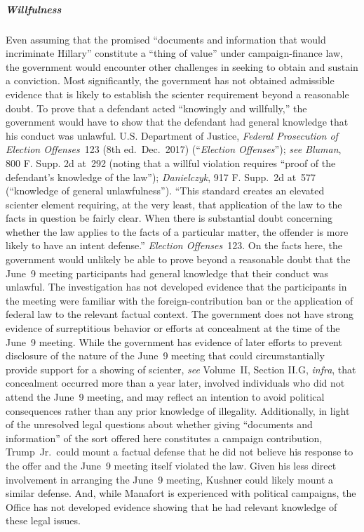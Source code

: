 \subparagraph{Willfulness}
Even assuming that the promised ``documents and information that would incriminate Hillary'' constitute a ``thing of value'' under campaign-finance law, the government would encounter other challenges in seeking to obtain and sustain a conviction.
Most significantly, the government has not obtained admissible evidence that is likely to establish the scienter requirement beyond a reasonable doubt.
To prove that a defendant acted ``knowingly and willfully,'' the government would have to show that the defendant had general knowledge that his conduct was unlawful.
U.S. Department of Justice, \textit{Federal Prosecution of Election Offenses}~123 (8th ed.\ Dec.~2017) (``\textit{Election Offenses}''); \textit{see Bluman}, 800 F. Supp. 2d at~292 (noting that a willful violation requires ``proof of the defendant's knowledge of the law''); \textit{Danielczyk}, 917 F. Supp.~2d at~577 (``knowledge of general unlawfulness'').
``This standard creates an elevated scienter element requiring, at the very least, that application of the law to the facts in question be fairly clear.
When there is substantial doubt concerning whether the law applies to the facts of a particular matter, the offender is more likely to have an intent defense.''
\textit{Election Offenses}~123.
On the facts here, the government would unlikely be able to prove beyond a reasonable doubt that the June~9 meeting participants had general knowledge that their conduct was unlawful.
The investigation has not developed evidence that the participants in the meeting were familiar with the foreign-contribution ban or the application of federal law to the relevant factual context.
The government does not have strong evidence of surreptitious behavior or efforts at concealment at the time of the June~9 meeting.
While the government has evidence of later efforts to prevent disclosure of the nature of the June~9 meeting that could circumstantially provide support for a showing of scienter, \textit{see} Volume~II, Section II.G, \textit{infra}, that concealment occurred more than a year later, involved individuals who did not attend the June~9 meeting, and may reflect an intention to avoid political consequences rather than any prior knowledge of illegality.
Additionally, in light of the unresolved legal questions about whether giving ``documents and information'' of the sort offered here constitutes a campaign contribution, Trump~Jr.\ could mount a factual defense that he did not believe his response to the offer and the June~9 meeting itself violated the law.
Given his less direct involvement in arranging the June~9 meeting, Kushner could likely mount a similar defense.
And, while Manafort is experienced with political campaigns, the Office has not developed evidence showing that he had relevant knowledge of these legal issues.

